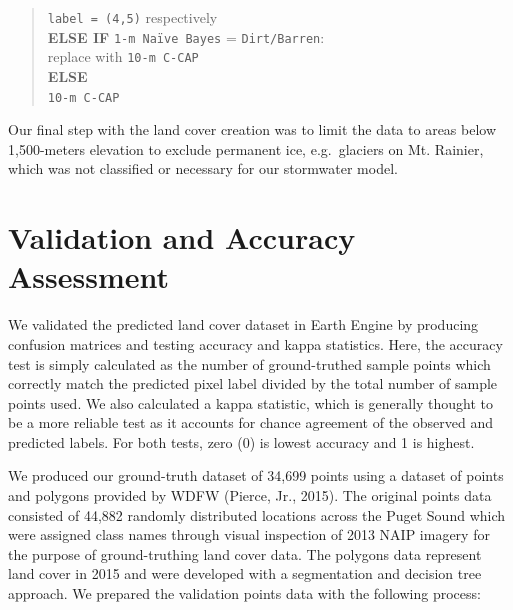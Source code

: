 \documentclass[
]{report}
\begin{document}
\begin{quote}
\hspace*{0.333em}\hspace*{0.333em}\texttt{label\ =\ (4,5)} respectively\\
\hspace*{0.333em}\textbf{ELSE IF} \texttt{1-m\ Naïve\ Bayes} = \texttt{Dirt/Barren}:\\
\hspace*{0.333em}\hspace*{0.333em}\hspace*{0.333em}replace with \texttt{10-m\ C-CAP}\\
\hspace*{0.333em}\textbf{ELSE}\\
\hspace*{0.333em}\hspace*{0.333em}\texttt{10-m\ C-CAP}
\end{quote}

Our final step with the land cover creation was to limit the data to areas below 1,500-meters elevation to exclude permanent ice, e.g.~glaciers on Mt. Rainier, which was not classified or necessary for our stormwater model.

\hypertarget{validation-and-accuracy-assessment}{%
\section{Validation and Accuracy Assessment}\label{validation-and-accuracy-assessment}}

We validated the predicted land cover dataset in Earth Engine by producing confusion matrices and testing accuracy and kappa statistics. Here, the accuracy test is simply calculated as the number of ground-truthed sample points which correctly match the predicted pixel label divided by the total number of sample points used. We also calculated a kappa statistic, which is generally thought to be a more reliable test as it accounts for chance agreement of the observed and predicted labels. For both tests, zero (0) is lowest accuracy and 1 is highest.

We produced our ground-truth dataset of 34,699 points using a dataset of points and polygons provided by WDFW (Pierce, Jr., 2015). The original points data consisted of 44,882 randomly distributed locations across the Puget Sound which were assigned class names through visual inspection of 2013 NAIP imagery for the purpose of ground-truthing land cover data. The polygons data represent land cover in 2015 and were developed with a segmentation and decision tree approach. We prepared the validation points data with the following process:
\end{document}
